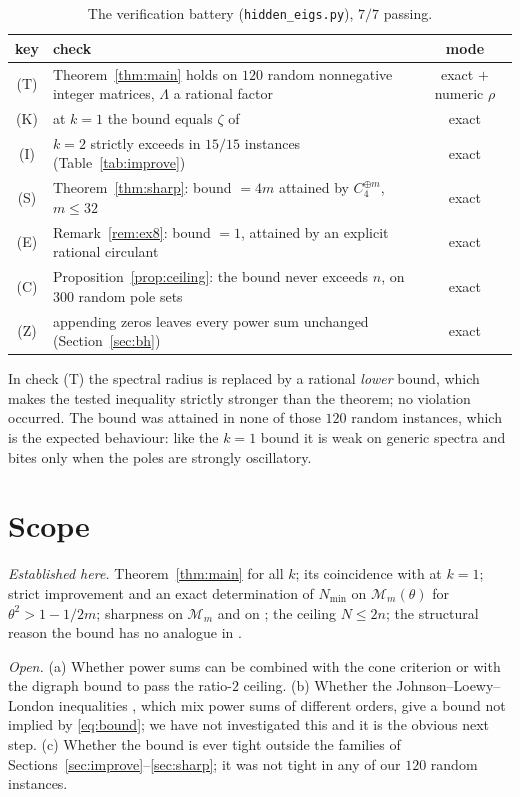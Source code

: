\documentclass[11pt]{article}
\theoremstyle{plain}
\theoremstyle{remark}
\newcommand{\M}{\mathcal{M}}
\begin{document}
\begin{table}[ht]
\centering\small
\begin{tabular}{cp{10.4cm}c}
\toprule
key & check & mode\\
\midrule
(T) & Theorem~\ref{thm:main} holds on $120$ random nonnegative integer matrices, $\Lambda$ a rational factor & exact $+$ numeric $\rho$\\
(K) & at $k=1$ the bound equals $\zeta$ of \cite[Thm.~4.7]{Ben20ELA} & exact\\
(I) & $k=2$ strictly exceeds \cite[Thm.~4.7]{Ben20ELA} in $15/15$ instances (Table~\ref{tab:improve}) & exact\\
(S) & Theorem~\ref{thm:sharp}: bound $=4m$ attained by $C_4^{\oplus m}$, $m\le32$ & exact\\
(E) & Remark~\ref{rem:ex8}: bound $=1$, attained by an explicit rational circulant & exact\\
(C) & Proposition~\ref{prop:ceiling}: the bound never exceeds $n$, on $300$ random pole sets & exact\\
(Z) & appending zeros leaves every power sum unchanged (Section~\ref{sec:bh}) & exact\\
\bottomrule
\end{tabular}
\caption{The verification battery (\texttt{hidden\_eigs.py}), $7/7$ passing.}
\label{tab:battery}
\end{table}

In check (T) the spectral radius is replaced by a rational \emph{lower} bound, which makes
the tested inequality strictly stronger than the theorem; no violation occurred. The bound
was attained in none of those $120$ random instances, which is the expected behaviour: like
the $k=1$ bound it is weak on generic spectra and bites only when the poles are strongly
oscillatory.

\section{Scope}\label{sec:scope}

\emph{Established here.} Theorem~\ref{thm:main} for all $k$; its coincidence with
\cite[Thm.~4.7]{Ben20ELA} at $k=1$; strict improvement and an exact determination of
$N_{\min}$ on $\M_m(\theta)$ for $\theta^{2}>1-1/2m$; sharpness on $\M_m$ and on
\cite[Ex.~8]{BF04}; the ceiling $N\le2n$; the structural reason the bound has no analogue
in \cite{BH91,KOR00}.

\emph{Open.} (a) Whether power sums can be combined with the cone criterion \cite{BF04} or
with the digraph bound \cite{NM03} to pass the ratio-$2$ ceiling. (b) Whether the
Johnson--Loewy--London inequalities \cite{LoewyLondon78}, which mix power sums of different
orders, give a bound not implied by \eqref{eq:bound}; we have not investigated this and it
is the obvious next step. (c) Whether the bound is ever tight outside the families of
Sections~\ref{sec:improve}--\ref{sec:sharp}; it was not tight in any of our $120$ random
instances.
\end{document}
